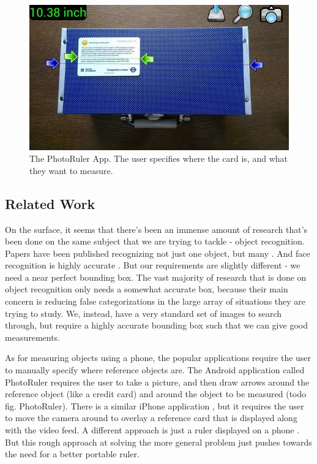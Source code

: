 \documentclass[10pt,twocolumn,letterpaper]{article}
\begin{document}
\begin{figure}[t]
\begin{center}
	   \includegraphics[width=0.8\linewidth]{measureapp}
\end{center}
   \caption{The PhotoRuler App. The user specifies where the card is, and what they want to measure.}
\label{fig:measureapp}
\end{figure}

\subsection{Related Work}

On the surface, it seems that there’s been an immense amount of research that’s been done on the same subject that we are trying to tackle - object recognition. Papers have been published recognizing not just one object, but many \cite{ObjectDetection}. And face recognition is highly accurate \cite{FaceDetection}. But our requirements are slightly different - we need a near perfect bounding box. The vast majority of research that is done on object recognition only needs a somewhat accurate box, because their main concern is reducing false categorizations in the large array of situations they are trying to study. We, instead, have a very standard set of images to search through, but require a highly accurate bounding box such that we can give good measurements.

As for measuring objects using a phone, the popular applications require the user to manually specify where reference objects are. The Android application called PhotoRuler \cite{PhotoRuler} requires the user to take a picture, and then draw arrows around the reference object (like a credit card) and around the object to be measured (todo fig. PhotoRuler). There is a similar iPhone application \cite{RulerPhone}, but it requires the user to move the camera around to overlay a reference card that is displayed along with the video feed. A different approach is just a ruler displayed on a phone \cite{SmartRuler}. But this rough approach at solving the more general problem just pushes towards the need for a better portable ruler.
\end{document}

